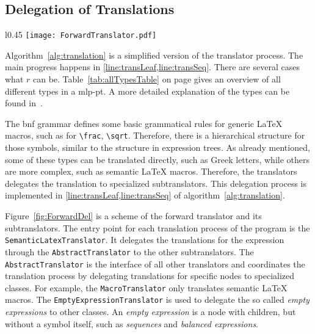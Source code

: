 \subsection{Delegation of Translations}\label{subsec:delegation}

\begin{wrapfigure}{l}{0.45\textwidth}
	\vspace{-20pt}
	\centering
	\texttt{[image: ForwardTranslator.pdf]}
	\caption{A scheme of the forward translator and its specialized subtranslators.}
	\label{fig:ForwardDel}
	\vspace{-25pt}
\end{wrapfigure}

Algorithm~\ref{alg:translation} is a simplified version of the translator process. The main progress happens in \cref{line:transLeaf,line:transSeq}. There are several cases what $r$ can be. Table~\ref{tab:allTypesTable} on page \pageref{tab:allTypesTable} gives an overview of all different types in a \gls{mlp-pt}. A more detailed explanation of the types can be found in~\cite{POM-Tagger}. 

The \gls{bnf} grammar defines some basic grammatical rules for generic \LaTeX{} macros, such as for \verb|\frac|, \verb|\sqrt|. Therefore, there is a hierarchical structure for those symbols, similar to the structure in expression trees. As already mentioned, some of these types can be translated directly, such as Greek letters, while others are more complex, such as semantic \LaTeX{} macros. Therefore, the translators delegates the translation to specialized subtranslators. This delegation process is implemented in \cref{line:transLeaf,line:transSeq} of algorithm~\ref{alg:translation}.

Figure~\ref{fig:ForwardDel} is a scheme of the forward translator and its subtranslators. The entry point for each translation process of the program is the \verb|SemanticLatexTranslator|. It delegates the translations for the expression through the \verb|AbstractTranslator| to the other subtranslators. The \verb|AbstractTranslator| is the interface of all other translators and coordinates the translation process by delegating translations for specific nodes to specialized classes. For example, the \verb|MacroTranslator| only translates semantic \LaTeX{} macros. The \verb|EmptyExpressionTranslator| is used to delegate the so called \textit{empty expressions} to other classes. An \textit{empty expression} is a node with children, but without a symbol itself, such as \textit{sequences} and \textit{balanced expressions}.


